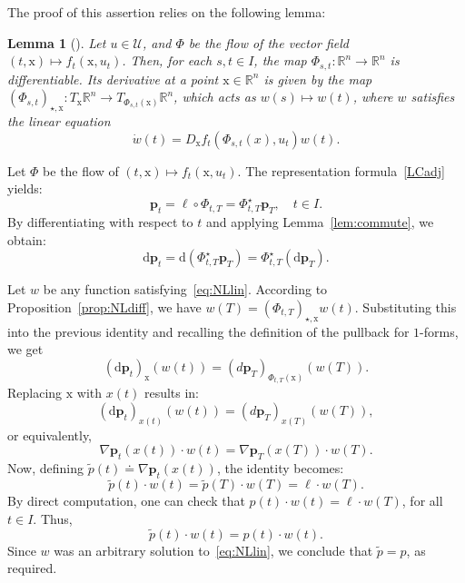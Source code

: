 \documentclass[sn-mathphys-num]{sn-jnl}
\numberwithin{equation}{section}
\theoremstyle{mythm}
\newtheorem{lemma}[proposition]{Lemma}
\theoremstyle{mydef}
\newenvironment{proofof}[1]{\smallskip\noindent{\textbf{Proof~of~#1.}}%
  \hspace{1pt}}{\hspace{-5pt}{\nobreak\quad\nobreak\hfill\nobreak%
    $\square$\vspace{2pt}\par}\smallskip\goodbreak}
\begin{document}
The proof of this assertion relies on the following lemma:
\begin{lemma}[\!]
  Let \( u \in \mathcal U\), and \( \Phi \) be the flow of the vector field \( (t,\mathrm{x}) \mapsto f_t(\mathrm{x}, u_t) \).
  Then, for each \( s, t \in I \), the map \( \Phi_{s,t} \colon \mathbb{R}^n \to \mathbb{R}^n \) is differentiable. Its derivative at a point \( \mathrm{x} \in \mathbb{R}^n \) is given by the map \( (\Phi_{s,t})_{\star,\mathrm{x}} \colon T_{\mathrm{x}} \mathbb{R}^n \to T_{\Phi_{s,t}(\mathrm{x})} \mathbb{R}^n \), which acts as \( w(s) \mapsto w(t) \), where \( w \) satisfies the linear equation
  \begin{equation}
    \label{eq:NLlin}
    \dot{w}(t) = D_\mathrm{x} f_t\left( \Phi_{s,t}(x), u_t \right) w(t).
  \end{equation}
\end{lemma}


\begin{proofof}{Proposition \ref{prop:NLdiff}}
  Let \( \Phi \) be the flow of \( (t,\mathrm{x}) \mapsto f_t(\mathrm{x}, u_t) \). The representation formula~\eqref{LCadj} yields:
  \[
    \bm{p}_t = \ell \circ \Phi_{t,T} = \Phi_{t,T}^\star \bm{p}_T, \quad t \in I.
  \]
  By differentiating with respect to \( t \) and applying Lemma~\ref{lem:commute}, we obtain:
  $$
    \mathrm{d} \bm{p}_t = \mathrm{d} \left( \Phi_{t,T}^\star \bm{p}_T \right) = \Phi_{t,T}^\star \left( \mathrm{d}\bm{p}_T \right).
  $$

  Let \( w \) be any function satisfying~\eqref{eq:NLlin}.
  According to Proposition~\ref{prop:NLdiff}, we have \( w(T) = (\Phi_{t,T})_{\star,\mathrm{x}} w(t) \).
  Substituting this into the previous identity and recalling the definition of the pullback for \( 1 \)-forms, we get
  \[
    (\mathrm{d} \bm{p}_t)_{\mathrm{x}}(w(t)) = (d \bm{p}_T)_{\Phi_{t,T}(\mathrm{x})}(w(T)).
  \]
  Replacing \( \mathrm{x} \) with \( x(t) \) results in:
  \[
    (\mathrm{d} \bm{p}_t)_{x(t)}(w(t)) = (d \bm{p}_T)_{x(T)}(w(T)),
  \]
  or equivalently,
  \[
    \nabla \bm{p}_t(x(t)) \cdot w(t) = \nabla \bm{p}_T(x(T)) \cdot w(T).
  \]
  Now, defining \( \widetilde{p}(t) \doteq \nabla \bm{p}_t(x(t)) \), the identity becomes:
  \[
    \widetilde{p}(t) \cdot w(t) = \widetilde{p}(T) \cdot w(T) = \ell \cdot w(T).
  \]
  By direct computation, one can check that 
  \( p(t) \cdot w(t) = \ell\cdot w(T)\), for all \( t\in I \).
  Thus,
  \[
    \widetilde{p}(t) \cdot w(t) = p(t) \cdot w(t).  
  \]
  Since \( w \) was an arbitrary solution to~\eqref{eq:NLlin}, we conclude that \( \widetilde{p} = p \), as required.
\end{proofof}
\end{document}
